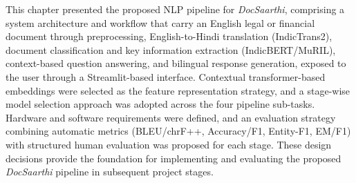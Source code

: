 This chapter presented the proposed NLP pipeline for \textit{DocSaarthi}, comprising a system architecture and workflow that carry an English legal or financial document through preprocessing, English-to-Hindi translation (IndicTrans2), document classification and key information extraction (IndicBERT/MuRIL), context-based question answering, and bilingual response generation, exposed to the user through a Streamlit-based interface. Contextual transformer-based embeddings were selected as the feature representation strategy, and a stage-wise model selection approach was adopted across the four pipeline sub-tasks. Hardware and software requirements were defined, and an evaluation strategy combining automatic metrics (BLEU/chrF++, Accuracy/F1, Entity-F1, EM/F1) with structured human evaluation was proposed for each stage. These design decisions provide the foundation for implementing and evaluating the proposed \textit{DocSaarthi} pipeline in subsequent project stages.
